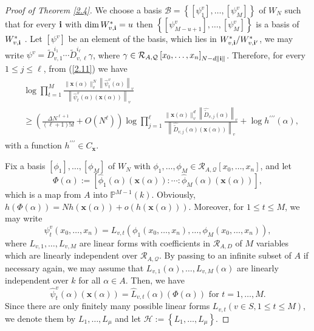 \documentclass[12pt,leqno]{amsart}
\numberwithin{equation}{section}
\begin{document}
\begin{proof}[Proof of Theorem \ref{2.4}]
We choose a basis $\mathcal{B}=\left\{\left[\psi^v_1\right], \ldots,\left[\psi^v_M\right]\right\}$ of $W_N$ such that for every ${\bf i}$ with $\dim W^*_{v,\bf i}=u$ then $\left\{\left[\psi^v_{M-u+1}\right], \ldots,\left[\psi^v_M\right]\right\}$ is a basis of $W^*_{v,\bf i}$ . Let $[\psi^v]$ be an element of the basis, which lies in $W_{v,{\bf i}}^* / W_{v,{\bf i}'}^*$, we may write $\psi^v=\widetilde{D}_{v,1}^{i_1} \cdots \widetilde{D}_{v,\ell}^{i_{\ell}} \gamma$, where $\gamma \in \mathcal{R}_{A, \mathcal{Q}}\left[x_0, \ldots, x_n\right]_{N-d\|{\bf i}\|}$. Therefore, for every $1 \leqslant j \leqslant \ell$, from (\ref{2.11}) we have
\begin{align}\label{2.12}
\begin{split}
&\log \prod_{t=1}^M \frac{\|\mathbf{x}(\alpha)\|_v^N\left\|\widehat{\psi}^v_t(\alpha)\right\|_v}{\left\|\widehat{\psi}^v_t(\alpha)(\mathbf{x}(\alpha))\right\|_v}\\
& \geq\left(\frac{\Delta N^{\ell+1}}{(\ell+1)!d}+O\left(N^{\ell}\right)\right)\log \prod_{j=1}^{\ell} \frac{\|\mathbf{x}(\alpha)\|_v^d\left\|\widehat{\widetilde D}_{v,j}(\alpha)\right\|_v}{\left\|\widehat{\widetilde D}_{v,j}(\alpha)(\mathbf{x}(\alpha))\right\|_v}+\log h^{\prime \prime \prime}(\alpha),
\end{split}
\end{align}
with a function $h^{\prime \prime \prime} \in C_{\mathbf{x}}$.

Fix a basis $\left[\phi_1\right], \ldots,\left[\phi_M\right]$ of $W_N$ with $\phi_1, \ldots, \phi_M \in \mathcal{R}_{A, \mathcal{Q}}\left[x_0, \ldots, x_n\right]$, and let
$$\Phi(\alpha):=\left[\widehat{\phi}_1(\alpha)(\mathbf{x}(\alpha)): \cdots: \widehat{\phi}_M(\alpha)(\mathbf{x}(\alpha))\right],$$
which is a map from $A$ into $\mathbb{P}^{M-1}(k).$
Obviously, $h(\Phi(\alpha))=N h(\mathbf{x}(\alpha))+o(h(\mathbf{x}(\alpha)))$.
Moreover, for $1 \leqslant t \leqslant M$, we may write
$$\psi^v_t\left(x_0, \ldots, x_n\right)=L_{v,t}\left(\phi_1\left(x_0, \ldots, x_n\right), \ldots, \phi_M\left(x_0, \ldots, x_n\right)\right),$$
where $L_{v,1}, \ldots, L_{v,M}$ are linear forms with coefficients in $\mathcal{R}_{A, D}$ of $M$ variables which are linearly independent over $\mathcal{R}_{A, \mathcal{Q}}$. By passing to an infinite subset of $A$ if necessary again, we may assume that $L_{v,1}(\alpha), \ldots, L_{v,M}(\alpha)$ are linearly independent over $k$ for all $\alpha \in A$. Then, we have
$$\widehat{\psi}^v_t(\alpha)(\mathbf{x}(\alpha))=\widehat{L}_{v,t}(\alpha)(\Phi(\alpha)) \text { for } t=1, \ldots, M .$$
Since there are only finitely many possible linear forms $L_{v,t}(v\in S, 1 \leqslant t \leqslant M)$, we denote them by $L_1, \ldots, L_\mu$ and let $\mathcal{H}:=\left\{L_1, \ldots,L_\mu\right\}$.


\end{proof}
\end{document}
